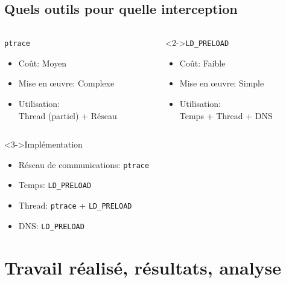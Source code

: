 \documentclass[10.5pt]{beamer}
\begin{document}
\subsection{Quels outils pour quelle interception}
\begin{frame}{\subsecname}
  \begin{columns}[c]
    \begin{column}{5cm}
      \begin{alertblock}{\texttt{ptrace}}
        \begin{itemize}
        \item Coût: Moyen
        \item Mise en \oe uvre: Complexe
        \item Utilisation: \\ Thread (partiel) + Réseau
        \end{itemize}
      \end{alertblock}
    \end{column}
    \begin{column}{5cm}
      \begin{alertblock}<2->{\texttt{LD\_PRELOAD}}
        \begin{itemize}
        \item Coût: Faible
        \item Mise en \oe uvre: Simple
        \item Utilisation: \\ Temps + Thread + DNS
        \end{itemize}
      \end{alertblock}
    \end{column}
  \end{columns}  

  \begin{alertblock}<3->{Implémentation}
    \begin{itemize}
    \item Réseau de communications: \texttt{ptrace}
    \item Temps: \texttt{LD\_PRELOAD}
    \item Thread: \texttt{ptrace} + \texttt{LD\_PRELOAD}
    \item DNS: \texttt{LD\_PRELOAD}
    \end{itemize}
  \end{alertblock}
\end{frame}
\section{Travail réalisé, résultats, analyse}
\end{document}

